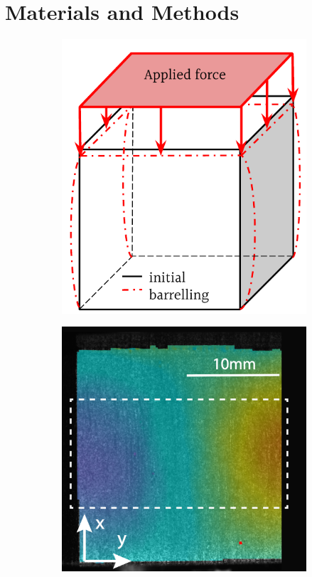 \documentclass[review]{elsarticle}
\begin{document}
\section{Materials and Methods}

\begin{figure}
    \centering
    \begin{subfigure}[b]{0.4\textwidth}
        \centering
        \includegraphics[width=\textwidth]{BarellingEffectZoomed.pdf}
        \caption{}
        \label{fig:barrelling}
    \end{subfigure}
    \hfill
    \begin{subfigure}[b]{0.4\textwidth}
        \centering
        \includegraphics[width=\textwidth]{BarellingPaper-eps-converted-to.pdf}

\end{subfigure}
\end{figure}
\end{document}
